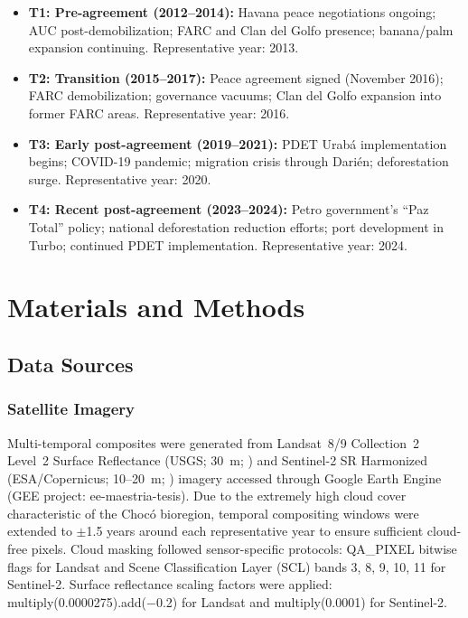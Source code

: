 \documentclass[12pt,a4paper]{article}
\begin{document}
\begin{itemize}
\item \textbf{T1: Pre-agreement (2012--2014):} Havana peace negotiations ongoing; AUC post-demobilization; FARC and Clan del Golfo presence; banana/palm expansion continuing. Representative year: 2013.
\item \textbf{T2: Transition (2015--2017):} Peace agreement signed (November 2016); FARC demobilization; governance vacuums; Clan del Golfo expansion into former FARC areas. Representative year: 2016.
\item \textbf{T3: Early post-agreement (2019--2021):} PDET Urab\'{a} implementation begins; COVID-19 pandemic; migration crisis through Dari\'{e}n; deforestation surge. Representative year: 2020.
\item \textbf{T4: Recent post-agreement (2023--2024):} Petro government's ``Paz Total'' policy; national deforestation reduction efforts; port development in Turbo; continued PDET implementation. Representative year: 2024.
\end{itemize}


\section{Materials and Methods}

\subsection{Data Sources}

\subsubsection{Satellite Imagery}

Multi-temporal composites were generated from Landsat~8/9 Collection~2 Level~2 Surface Reflectance (USGS; 30~m; \citealp{Wulder2022}) and Sentinel-2 SR Harmonized (ESA/Copernicus; 10--20~m; \citealp{Drusch2012}) imagery accessed through Google Earth Engine (GEE project: ee-maestria-tesis). Due to the extremely high cloud cover characteristic of the Choc\'{o} bioregion, temporal compositing windows were extended to $\pm$1.5 years around each representative year to ensure sufficient cloud-free pixels. Cloud masking followed sensor-specific protocols: QA\_PIXEL bitwise flags for Landsat and Scene Classification Layer (SCL) bands 3, 8, 9, 10, 11 for Sentinel-2. Surface reflectance scaling factors were applied: multiply(0.0000275).add($-$0.2) for Landsat and multiply(0.0001) for Sentinel-2.
\end{document}
